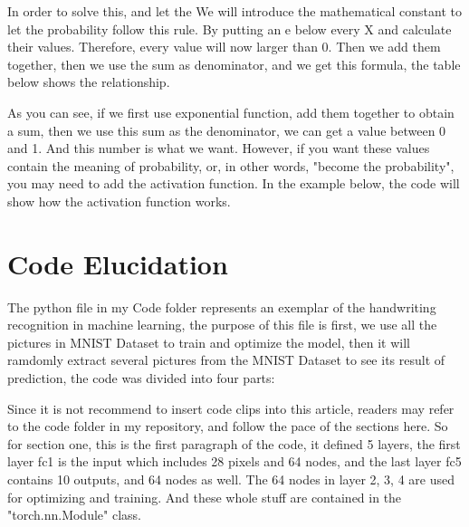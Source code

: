 \documentclass[12pt]{article}
\begin{document}
In order to solve this, and let the We will introduce  the mathematical constant to let the probability follow this rule. By putting an e below every X and calculate their values. Therefore, every value will now larger than 0. Then we add them together, then we use the sum as denominator, and we get this formula, the table below shows the relationship.

\begin{table}[h!]
\centering
{}
\caption{Softmax Normalization}
\label{table:your_label}
\end{table}

As you can see, if we first use exponential function, add them together to obtain a sum, then we use this sum as the denominator, we can get a value between 0 and 1. And this number is what we want. However, if you want these values contain the meaning of probability, or, in other words, "become the probability", you may need to add the activation function. In the example below, the code will show how the activation function works.

\section*{Code Elucidation}
The python file in my Code folder represents an exemplar of the handwriting recognition in machine learning, the purpose of this file is first, we use all the pictures in MNIST Dataset to train and optimize the model, then it will ramdomly extract several pictures from the MNIST Dataset to see its result of prediction, the code was divided into four parts:

Since it is not recommend to insert code clips into this article, readers may refer to the code folder in my repository, and follow the pace of the sections here. So for section one, this is the first paragraph of the code, it defined 5 layers, the first layer fc1 is the input which includes 28 pixels and 64 nodes, and the last layer fc5 contains 10 outputs, and 64 nodes as well. The 64 nodes in layer 2, 3, 4 are used for optimizing and training. And these whole stuff are contained in the "torch.nn.Module" class. 
\end{document}
